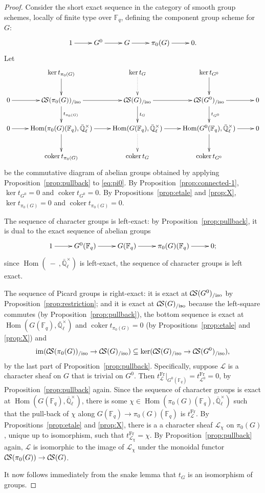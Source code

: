 \documentclass[11pt]{amsart}
\theoremstyle{plain}
\theoremstyle{definition}
\theoremstyle{remark}
\newcommand{\EE}{\mathbb{\bar Q}_\ell}
\newcommand{\Fq}{{\mathbb{F}_q}}
\newcommand{\Frob}{{\operatorname{Fr}}}
\DeclareMathOperator{\Hom}{Hom}
\DeclareMathOperator{\coker}{coker}
\newcommand{\cs}[1]{{\mathcal{#1}}}
\newcommand{\CS}{{\mathcal{C\hskip-1.8pt S}}}
\newcommand{\image}{{\operatorname{im}}}
\begin{document}
\begin{proof}
Consider the short exact sequence in the category of smooth group schemes, locally of finite type over $\Fq$, defining the component group scheme for $G$:
\begin{equation}\label{eq:pi0}
\xymatrix{
1 \ar[r] & G^0 \ar[r] & G \ar[r] & \pi_0(G) \ar[r] & 0.
}
\end{equation}
Let 
\[
\xymatrix{
& \ar[d] \ker t_{\pi_0(G)} & \ar@{.>}[d] \ker t_{G} & \ar[d] \ker t_{G^0} & \\
0\ar[r] & \ar[d]^{t_{\pi_0(G)}} \CS(\pi_0(G))_{/\text{iso}} \ar[r] & \ar[d]^{t_{G}} \CS(G)_{/\text{iso}} \ar[r] & \ar[d]^{t_{G^0}} \CS(G^0)_{/\text{iso}} \ar[r] & 0\\
0 \ar[r] & \ar[d] \Hom(\pi_0(G)(\Fq),\EE^\times) \ar[r] & \ar@{.>}[d] \Hom(G(\Fq),\EE^\times) \ar[r] & \ar[d] \Hom(G^0(\Fq),\EE^\times) \ar[r] & 0\\
& \coker t_{\pi_0(G)} & \coker t_{G} &  \coker t_{G^0} & \\
}
\]
be the commutative diagram of abelian groups obtained by applying Proposition~\ref{prop:pullback} to \eqref{eq:pi0}.
By Proposition~\ref{prop:connected-1}, $\ker t_{G^0} =0$ and $\coker t_{G^0}=0$. By Propositions~\ref{prop:etale} and \ref{prop:X}, $\ker t_{\pi_0(G)}=0$ and $\coker t_{\pi_0(G)}=0$. 


The sequence of character groups is left-exact: by Proposition~\ref{prop:pullback}, it is dual to the exact sequence of abelian groups
\begin{equation}\label{eq:pi0}
\xymatrix{
1 \ar[r] & G^0(\Fq) \ar[r] & G(\Fq) \ar[r] & \pi_0(G)(\Fq) \ar[r] & 0;
}
\end{equation}
since $\Hom(\ - \ ,\EE^\times)$ is left-exact, the sequence of character groups is left exact. 

The sequence of Picard groups is right-exact:  it is exact at $\CS(G^0)_{/\text{iso}}$ by Proposition~\ref{prop:restriction}; and it is exact at $\CS(G)_{/\text{iso}}$ because the left-square commutes (by Proposition~\ref{prop:pullback}), the bottom sequence is exact at $\Hom(G(\Fq),\EE^\times)$ and $\coker t_{\pi_0(G)} =0$ (by Propositions~\ref{prop:etale} and \ref{prop:X}) and
\[
\image(\CS(\pi_0(G))_{/\text{iso}} \to \CS(G)_{/\text{iso}}) \subseteq \ker(\CS(G)_{/\text{iso}} \to \CS(G^0)_{/\text{iso}}),
\]
by the last part of Proposition~\ref{prop:pullback}. Specifically, suppose $\cs{L}$ is a character sheaf on $G$ that is trivial on $G^0$. Then $t^\Frob_\cs{L}\vert_{G^0(\Fq)} = t^\Frob_{\cs{L}^0} =0$, by Proposition~\ref{prop:pullback} again. Since the sequence of character groups is exact at $\Hom(G(\Fq),\EE^\times)$, there is some $\chi \in \Hom(\pi_0(G)(\Fq),\EE^\times)$ such that the pull-back of $\chi$ along $G(\Fq)\to \pi_0(G)(\Fq)$ is $t^\Frob_\cs{L}$. By Propositions~\ref{prop:etale} and \ref{prop:X}, there is a a character sheaf $\cs{L}_\chi$ on $\pi_0(G)$, unique up to isomorphism, such that $t^\Frob_{\cs{L}_\chi} = \chi$. By Proposition~\ref{prop:pullback} again, $\cs{L}$ is isomorphic to the image of $\cs{L}_\chi$ under the monoidal functor $\CS(\pi_0(G)) \to \CS(G)$.

It now follows immediately from the snake lemma that $t_{G}$ is an isomorphism of groups.
\end{proof}
\end{document}
